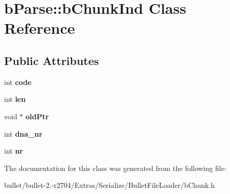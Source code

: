\hypertarget{classb_parse_1_1b_chunk_ind}{\section{b\+Parse\+:\+:b\+Chunk\+Ind Class Reference}
\label{classb_parse_1_1b_chunk_ind}
}
\subsection*{Public Attributes}
\begin{DoxyCompactItemize}
\item 
\hypertarget{classb_parse_1_1b_chunk_ind_a628d51ef88912cc4a07d685c25d02f1d}{int {\bfseries code}}\label{classb_parse_1_1b_chunk_ind_a628d51ef88912cc4a07d685c25d02f1d}

\item 
\hypertarget{classb_parse_1_1b_chunk_ind_abb5f230ce899f96846022409ca649c87}{int {\bfseries len}}\label{classb_parse_1_1b_chunk_ind_abb5f230ce899f96846022409ca649c87}

\item 
\hypertarget{classb_parse_1_1b_chunk_ind_aced4d6cabe64b4e48fe4b2985758e3a8}{void $\ast$ {\bfseries old\+Ptr}}\label{classb_parse_1_1b_chunk_ind_aced4d6cabe64b4e48fe4b2985758e3a8}

\item 
\hypertarget{classb_parse_1_1b_chunk_ind_abf1998975f01a1349c20dbbeded96bda}{int {\bfseries dna\+\_\+nr}}\label{classb_parse_1_1b_chunk_ind_abf1998975f01a1349c20dbbeded96bda}

\item 
\hypertarget{classb_parse_1_1b_chunk_ind_aee64e947efd1ffedd1a28a937b9d5f6c}{int {\bfseries nr}}\label{classb_parse_1_1b_chunk_ind_aee64e947efd1ffedd1a28a937b9d5f6c}

\end{DoxyCompactItemize}


The documentation for this class was generated from the following file\+:\begin{DoxyCompactItemize}
\item 
bullet/bullet-\/2.-\/r2704/\+Extras/\+Serialize/\+Bullet\+File\+Loader/b\+Chunk.\+h\end{DoxyCompactItemize}

